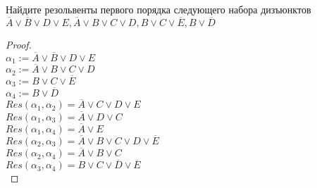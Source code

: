 
\renewcommand*{\proofname}{Решение}
\newcommand*\circled[1]{\tikz[baseline=(char.base)]{\node[shape=circle,draw,inner sep=2pt] (char) {#1};}}
\newcommand*\ccircled[1]{\tikz[baseline=(char.base)]
{\node[shape=circle,draw=black, fill=gray, opacity=0.8,inner sep=2pt] (char) {#1};}}
\newcommand*\bicircled[1]{\tikz[baseline=(char.base)]{\node[shape=circle,draw,inner sep=1pt] (char) {#1};}}




\begin{problem}
Найдите резольвенты первого порядка следующего набора дизъюнктов $\overline{A} \vee \overline{B} \vee D \vee E, \overline{A} \vee B \vee C \vee D, B \vee C \vee \overline{E}, B \vee \overline{D}$
\end{problem}
\begin{proof} $ $\\
    $\alpha_1 := \overline{A} \vee \overline{B} \vee D \vee E$\\
    $\alpha_2 := \overline{A} \vee B \vee C \vee D$\\
    $\alpha_3 :=  B \vee C \vee \overline{E}$\\
    $\alpha_4 := B \vee \overline{D}$\\
    $Res(\alpha_1, \alpha_2) = \overline{A} \vee C \vee D \vee E$\\
    $Res(\alpha_1, \alpha_3) = \overline{A} \vee D \vee C$\\
    $Res(\alpha_1, \alpha_4) = \overline{A} \vee E$\\
    $Res(\alpha_2, \alpha_3) = \overline{A} \vee B \vee C \vee D \vee \overline{E}$\\
    $Res(\alpha_2, \alpha_4) = \overline{A} \vee B \vee C$\\
    $Res(\alpha_3, \alpha_4) = B \vee C \vee \overline{D} \vee \overline{E}$\\
\end{proof}


